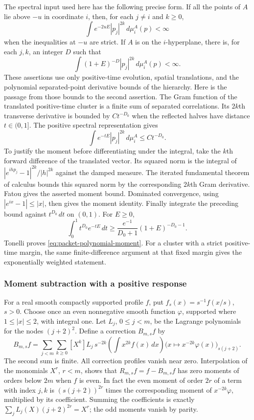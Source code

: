 The spectral input used here has the following precise form. If all the
points of $A$ lie above $-u$ in coordinate $i$, then, for each $j\ne i$
and $k\geq0$,
\[
 \int e^{-2uE}|p_j|^{2k}\,d\mu_i^A(p)<\infty
\]
when the inequalities at $-u$ are strict. If $A$ is on the $i$-hyperplane,
there is, for each $j,k$, an integer $D$ such that
\begin{equation}\label{eq:packet-polynomial-moment}
 \int(1+E)^{-D}|p_j|^{2k}\,d\mu_i^A(p)<\infty.
\end{equation}
These assertions use only positive-time evolution, spatial translations,
and the polynomial separated-point derivative bounds of the hierarchy.
Here is the passage from those bounds to the second assertion. The Gram
function of the translated positive-time cluster is a finite sum of
separated correlations. Its $2k$th transverse derivative is bounded by
$C t^{-D_0}$ when the reflected halves have distance $t\in(0,1]$.
The positive spectral representation gives
\[
 \int e^{-tE}|p_j|^{2k}\,d\mu_i^A\leq C t^{-D_0}.
\]
To justify the moment before differentiating under the integral, take the
$k$th forward difference of the translated vector. Its squared norm is
the integral of $|e^{ihp_j}-1|^{2k}/|h|^{2k}$ against the damped measure.
The iterated fundamental theorem of calculus bounds this squared norm by
the corresponding $2k$th Gram derivative. Fatou gives the asserted moment
bound. Dominated convergence, using $|e^{ix}-1|\leq |x|$, then gives the
moment identity. Finally integrate the preceding bound against
$t^{D_0}\,dt$ on $(0,1)$. For $E\geq0$,
\[
 \int_0^1t^{D_0}e^{-tE}\,dt
 \geq \frac{e^{-1}}{D_0+1}(1+E)^{-D_0-1}.
\]
Tonelli proves \eqref{eq:packet-polynomial-moment}. For a cluster with a
strict positive-time margin, the same finite-difference argument at that
fixed margin gives the exponentially weighted statement.

\subsubsection{Moment subtraction with a positive response}

For a real smooth compactly supported profile $f$, put
$f_s(x)=s^{-1}f(x/s)$, $s>0$. Choose once an even nonnegative smooth
function $\varphi$, supported where $1\leq|x|\leq2$, with integral one.
Let $L_j$, $0\leq j<m$, be the Lagrange polynomials for the nodes
$(j+2)^2$. Define a correction $B_{m,s}f$ by
\begin{equation}\label{eq:packet-correction}
 B_{m,s}f=
 \sum_{j<m}\sum_{k\geq0}[X^k]L_j\,
       s^{-2k}\!\left(\int x^{2k}f(x)\,dx\right)
       \bigl(x\mapsto x^{-2k}\varphi(x)\bigr)_{s(j+2)}.
\end{equation}
The second sum is finite. All correction profiles vanish near zero.
Interpolation of the monomials $X^r$, $r<m$, shows that
$R_{m,s}f=f-B_{m,s}f$ has zero moments of orders below $2m$ when $f$ is
even. In fact the even moment of order $2r$ of a term with index $j,k$
is $(s(j+2))^{2r}$ times the corresponding moment of
$x^{-2k}\varphi$, multiplied by its coefficient. Summing the coefficients
is exactly $\sum_j L_j(X)(j+2)^{2r}=X^r$; the odd moments vanish by parity.


